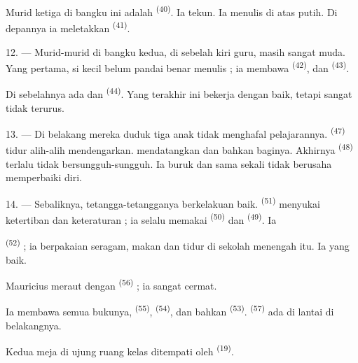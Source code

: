 Murid ketiga di bangku ini adalah 
\textsuperscript{(40)}. Ia tekun. Ia menulis di atas  putih. Di depannya ia meletakkan 
\textsuperscript{(41)}.

12. --- Murid-murid di bangku kedua, di sebelah kiri guru, masih
sangat muda. Yang pertama, si kecil  belum pandai
benar menulis ; ia membawa  \textsuperscript{(42)},
 dan  \textsuperscript{(43)}.

Di sebelahnya ada  dan 
\textsuperscript{(44)}. Yang terakhir ini bekerja dengan baik, tetapi
 sangat tidak terurus.

13. --- Di belakang mereka duduk tiga anak  tidak menghafal pelajarannya. 
\textsuperscript{(47)} tidur alih-alih mendengarkan.
 mendatangkan  dan bahkan
 baginya. Akhirnya 
\textsuperscript{(48)} terlalu tidak bersungguh-sungguh. Ia
 buruk dan sama sekali tidak berusaha
memperbaiki diri.

14. --- Sebaliknya, tetangga-tetangganya berkelakuan baik.
 \textsuperscript{(51)} menyukai ketertiban dan
keteraturan ; ia selalu memakai 
\textsuperscript{(50)} dan  \textsuperscript{(49)}.
Ia 

 \textsuperscript{(52)}  ; ia
berpakaian seragam, makan dan tidur di sekolah menengah itu. Ia
 yang baik.

Mauricius meraut  dengan 
\textsuperscript{(56)} ; ia sangat cermat.

Ia membawa semua bukunya, 
\textsuperscript{(55)},  \textsuperscript{(54)},
dan bahkan  \textsuperscript{(53)}.  \textsuperscript{(57)} ada di lantai di belakangnya.

Kedua meja di ujung ruang kelas ditempati oleh  \textsuperscript{(19)}.

\VUsaut{4.6mm}
\VUsaut{3.4mm}

